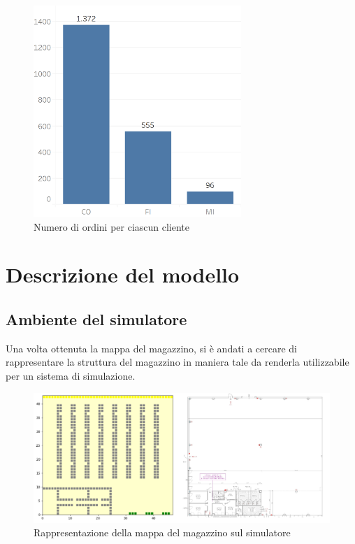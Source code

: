 \documentclass[12pt]{article}
\begin{document}
\begin{figure}[ht]
\centering
\includegraphics[width=0.7\textwidth,height=\textheight,keepaspectratio]{Figures/Initial_Dataset/Orders_client.png}
\caption[Numero di ordini per ciascun cliente]{Numero di ordini per ciascun cliente}
\label{fig:OrdiniClientiIniziali}
\end{figure}


\newpage
\section{Descrizione del modello}

\subsection{Ambiente del simulatore}
Una volta ottenuta la mappa del magazzino, si è andati a cercare di rappresentare la struttura del magazzino in maniera tale da renderla utilizzabile per un sistema di simulazione.
\begin{figure}[ht]
\includegraphics[width=\linewidth]{Figures/Graphics/Simulation_Domain.PNG}
\caption{Rappresentazione della mappa del magazzino sul simulatore}\label{fig:Rappresentazione_mappa}
\end{figure}
\end{document}
